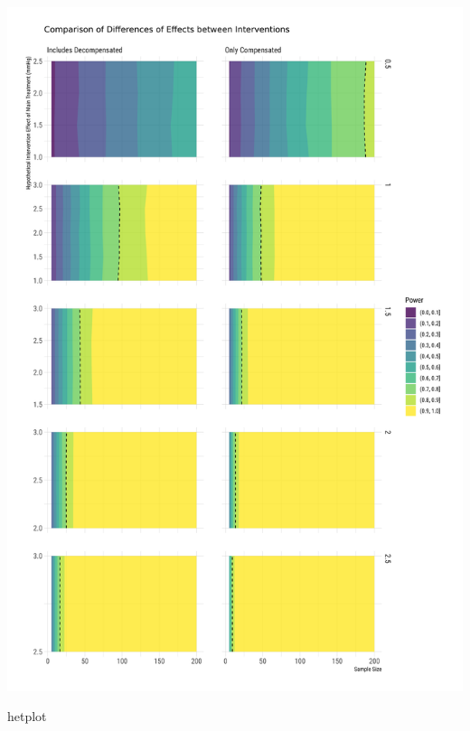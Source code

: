 \documentclass[
]{article}
\newenvironment{Shaded}{\begin{snugshade}}{\end{snugshade}}
\newcommand{\NormalTok}[1]{#1}
\begin{document}
\includegraphics{figures/unnamed-chunk-68-1.png}

\begin{Shaded}
\begin{Highlighting}[]
\NormalTok{hetplot}
\end{Highlighting}
\end{Shaded}
\end{document}
